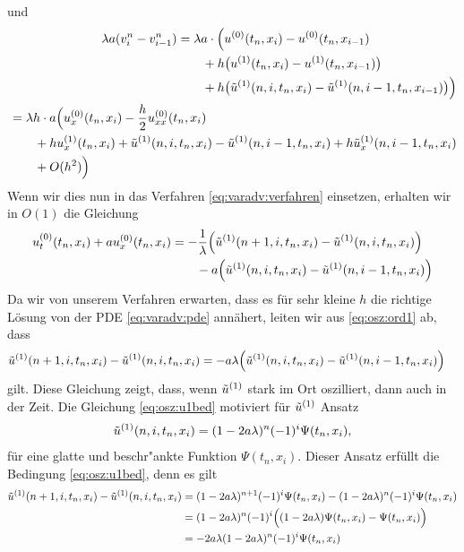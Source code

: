 und
{\small
\begin{align}
\begin{split}\nonumber
\lambda a (v^n_{i} - v^n_{i-1}) &= \lambda a \cdot \Bigl( u^{(0)}(t_n, x_i) - u^{(0)}(t_n, x_{i-1})\\
&\qquad + h \bigl( u^{(1)}(t_n, x_i) - u^{(1)}(t_n, x_{i-1}) \bigr)\\
&\qquad +  h \bigl( \tilde u^{(1)}(n, i, t_n, x_i) - \tilde u^{(1)}(n, i-1, t_n, x_{i-1}) \bigr) \Bigr)
\end{split}\\
\begin{split} \label{eq:osz:diff2}
&= \lambda h \cdot a  \Bigl( u^{(0)}_x(t_n, x_i) - \frac {h} 2 u^{(0)}_{xx}(t_n, x_i)\\
&\qquad + h u^{(1)}_x(t_n, x_i) +  \tilde u^{(1)}(n, i, t_n, x_i) - \tilde u^{(1)}(n, i-1, t_n, x_i) + h \tilde u^{(1)}_x(n, i-1, t_n, x_i)\\
&\qquad + O(h^2) \Bigr)
\end{split}
\end{align}
}
Wenn wir dies nun in das Verfahren \eqref{eq:varadv:verfahren} einsetzen, erhalten wir in $O(1)$ die Gleichung
\begin{align}\label{eq:osz:ord1}
\begin{split}
u^{(0)}_t(t_n, x_i) + a u^{(0)}_x(t_n, x_i)
&= - \frac 1 \lambda \Bigl(  \tilde u^{(1)}(n+1, i, t_n, x_i) - \tilde u^{(1)}(n, i, t_n, x_i) \Bigr)
\\&\qquad - a \Bigl( \tilde u^{(1)}(n, i, t_n, x_i) - \tilde u^{(1)}(n, i-1, t_n, x_i) \Bigr)
\end{split}
\end{align}
Da wir von unserem Verfahren erwarten, dass es für sehr kleine $h$ die richtige Lösung von der PDE \eqref{eq:varadv:pde} annähert, leiten wir aus \eqref{eq:osz:ord1} ab, dass
\begin{align}\label{eq:osz:u1bed}
\tilde u^{(1)}(n+1, i, t_n, x_i) - \tilde u^{(1)}(n, i, t_n, x_i)
&= - a \lambda \Bigl( \tilde u^{(1)}(n, i, t_n, x_i) - \tilde u^{(1)}(n, i-1, t_n, x_i) \Bigr)
\end{align}
gilt.
Diese Gleichung zeigt, dass, wenn $\tilde u^{(1)}$ stark im Ort oszilliert, dann auch in der Zeit.
Die Gleichung \eqref{eq:osz:u1bed} motiviert für $\tilde u^{(1)}$ Ansatz
\begin{align} \label{eq:osz:u1ansatz}
\tilde u^{(1)}(n, i, t_n, x_i) = (1 - 2 a \lambda)^n (-1)^i \Psi(t_n, x_i),
\end{align}
für eine glatte und beschr"ankte Funktion $\Psi(t_n, x_i)$.
Dieser Ansatz erfüllt die Bedingung \eqref{eq:osz:u1bed}, denn es gilt
\begin{align*}
\tilde u^{(1)}(n+1, i, t_n, x_i) - \tilde u^{(1)}(n, i, t_n, x_i)
&= (1 - 2 a \lambda)^{n+1} (-1)^i \Psi(t_n, x_i) - (1 - 2 a \lambda)^n (-1)^i \Psi(t_n, x_i)\\
&= (1 - 2 a \lambda)^n (-1)^i \Bigl( (1 - 2 a \lambda) \Psi(t_n, x_i) - \Psi(t_n, x_i) \Bigr)\\
&= - 2 a \lambda (1 - 2 a \lambda)^n (-1)^i \Psi(t_n, x_i)
\end{align*}
